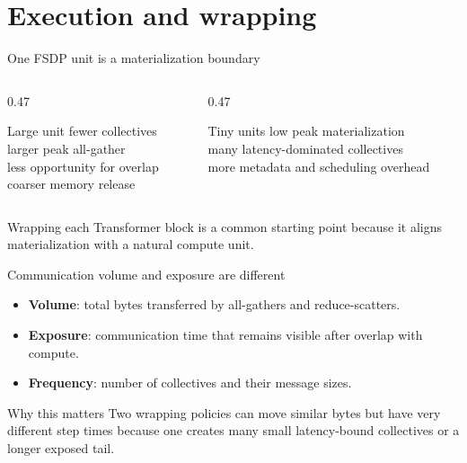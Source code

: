 \documentclass[handout]{beamer}
\begin{document}
\section{Execution and wrapping}

\begin{frame}{One FSDP unit is a materialization boundary}
  \begin{columns}[t]
    \begin{column}{0.47\linewidth}
      \begin{block}{Large unit}
        fewer collectives\\larger peak all-gather\\less opportunity for overlap\\coarser memory release
      \end{block}
    \end{column}
    \begin{column}{0.47\linewidth}
      \begin{alertblock}{Tiny units}
        low peak materialization\\many latency-dominated collectives\\more metadata and scheduling overhead
      \end{alertblock}
    \end{column}
  \end{columns}
  \vfill
  Wrapping each Transformer block is a common starting point because it aligns materialization with a natural compute unit.
\end{frame}

\begin{frame}{Communication volume and exposure are different}
  \begin{itemize}
    \setlength{\itemsep}{8pt}
    \item \textbf{Volume}: total bytes transferred by all-gathers and reduce-scatters.
    \item \textbf{Exposure}: communication time that remains visible after overlap with compute.
    \item \textbf{Frequency}: number of collectives and their message sizes.
  \end{itemize}
  \begin{alertblock}{Why this matters}
    Two wrapping policies can move similar bytes but have very different step times because one creates many small latency-bound collectives or a longer exposed tail.
  \end{alertblock}
\end{frame}
\end{document}
